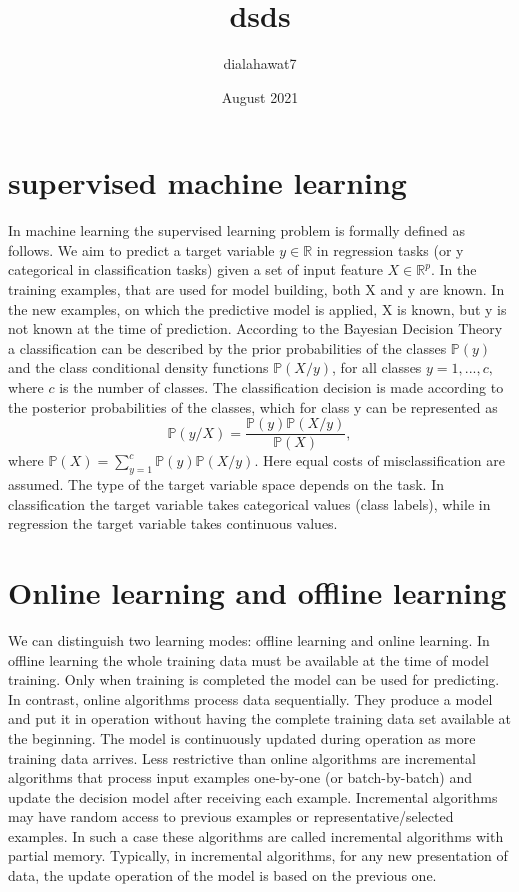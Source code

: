 \documentclass{article}
\title{dsds}
\author{dialahawat7 }
\date{August 2021}
\begin{document}
\section{supervised machine learning}
In machine learning the supervised learning problem is formally defined as follows.
We aim to predict a target variable $y \in \mathbb{R}$ in regression tasks (or y categorical in classification tasks) given a set of input feature $X \in \mathbb{R}^p$.
In the training examples, that are used for model building, both X and y are known.
In the new examples, on which the predictive model is applied, X is known, but y is not known at the time of prediction.
According to the Bayesian Decision Theory a classification can
be described by the prior probabilities of the classes $\mathbb{P}(y)$ and the class conditional density functions $\mathbb{P}(X/y)$, for all classes $y=1,...,c,$ where $c$ is the number of classes.
The classification decision is made according to the posterior probabilities of the classes, which for class y can be represented as
$$\mathbb{P}(y/X) = \frac{\mathbb{P}(y)\mathbb{P}(X/y)}{\mathbb{P}(X)},$$
where $\mathbb{P}(X)= \sum_{y=1}^c \mathbb{P}(y)\mathbb{P}(X/y)$.
Here equal costs of misclassification are assumed.
The type of the target variable space depends on the task.
In classification the target variable takes categorical values (class labels), while in regression the target variable takes continuous values.
\section{Online learning and offline learning}
We can distinguish two learning modes: offline learning and online learning.
In offline learning the whole training data must be available at the time of model training.
Only when training is completed the model can be used for predicting. In contrast, online algorithms process data sequentially. They produce a model and put it in operation without having the complete training data set available at the beginning.
The model is continuously updated during operation as more training data arrives.
Less restrictive than online algorithms are incremental algorithms that process input examples one-by-one (or batch-by-batch) and update the decision model after receiving each example.
Incremental algorithms may have random access to previous examples or representative/selected examples.
In such a case these algorithms are called incremental algorithms with partial memory.
Typically, in incremental algorithms, for any new presentation of data, the update operation of the model is based on the previous one.
\end{document}
